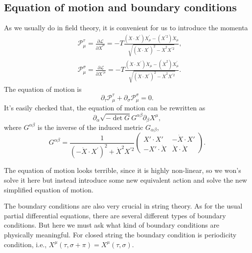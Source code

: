 \documentclass[graybox,envcountchap,sectrefs]{svmono}
\begin{document}
\subsection{Equation of motion and boundary conditions}
As we usually do in field theory, it is convenient for us to introduce the momenta
\begin{align}
&\mathcal{P}_{\mu}^{\tau}=\frac{\partial \mathcal{L}}{\partial \dot{X}^{\mu}}
=-T \frac{(\dot{X} \cdot X^{\prime}) X_{\mu}^{\prime}-(X^{\prime 2}) \dot{X}_{\mu}}{\sqrt{(\dot{X} \cdot X^{\prime})^{2}-\dot{X}^{2} X^{\prime 2}}},\\
&\mathcal{P}_{\mu}^{\sigma}=\frac{\partial \mathcal{L}}{\partial X^{\prime \mu}}
=-T \frac{(\dot{X} \cdot X^{\prime}) \dot{X}_{\mu}-(\dot{X}^{2}) X_{\mu}^{\prime}}{\sqrt{(\dot{X} \cdot X^{\prime})^{2}-\dot{X}^{2} X^{\prime 2}}}.
\end{align}
The equation of motion is 
\begin{equation}
\partial_{\tau}	\mathcal{P}_{\mu}^{\tau}+\partial_{\sigma}\mathcal{P}_{\mu}^{\sigma}=0.
\end{equation}
It's easily checked that, the equation of motion can be rewritten as
\begin{equation}
\partial_{\alpha}\sqrt{-\det G}G^{\alpha\beta}\partial_{\beta}X^{\mu},	
\end{equation}
where $G^{\alpha\beta}$ is the inverse of the induced metric $G_{\alpha\beta}$,
\begin{equation}
G^{\alpha\beta}=\frac{1}{(-\dot{X} \cdot X^{\prime})^{2}+\dot{X}^{2} X^{\prime 2}}\left(\begin{matrix}
 X'\cdot X' & -\dot{X}\cdot X' \\
 -X'\cdot \dot{X} & \dot{X}\cdot \dot{X}
\end{matrix}
	\right).
\end{equation}

The equation of motion looks terrible, since it is highly non-linear, so we won's solve it here but instead introduce some new equivalent action and solve the new simplified equation of motion.

The boundary conditions are also very crucial in string theory. As for the usual partial differential equations, there are several different types of boundary conditions. But here we must ask what kind of boundary conditions are physically meaningful.
For closed string the boundary condition is periodicity condition, i.e., $X^{\mu}(\tau,\sigma+\pi)=X^{\mu}(\tau,\sigma)$.
\end{document}

